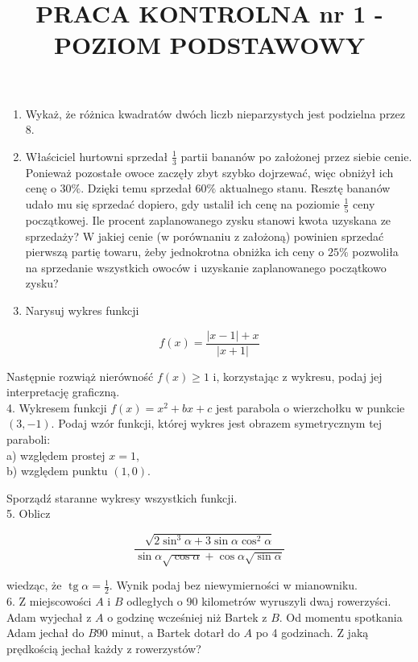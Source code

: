 \documentclass[10pt]{article}
\title{PRACA KONTROLNA nr 1 - POZIOM PODSTAWOWY }
\author{}
\date{}
\begin{document}
\maketitle
\begin{enumerate}
  \item Wykaż, że różnica kwadratów dwóch liczb nieparzystych jest podzielna przez 8.
  \item Właściciel hurtowni sprzedał $\frac{1}{3}$ partii bananów po założonej przez siebie cenie. Ponieważ pozostałe owoce zaczęły zbyt szybko dojrzewać, więc obniżył ich cenę o $30 \%$. Dzięki temu sprzedał $60 \%$ aktualnego stanu. Resztę bananów udało mu się sprzedać dopiero, gdy ustalił ich cenę na poziomie $\frac{1}{5}$ ceny początkowej. Ile procent zaplanowanego zysku stanowi kwota uzyskana ze sprzedaży? W jakiej cenie (w porównaniu z założoną) powinien sprzedać pierwszą partię towaru, żeby jednokrotna obniżka ich ceny o $25 \%$ pozwoliła na sprzedanie wszystkich owoców i uzyskanie zaplanowanego początkowo zysku?
  \item Narysuj wykres funkcji
\end{enumerate}

$$
f(x)=\frac{|x-1|+x}{|x+1|}
$$

Następnie rozwiąż nierówność $f(x) \geqslant 1$ i, korzystając z wykresu, podaj jej interpretację graficzną.\\
4. Wykresem funkcji $f(x)=x^{2}+b x+c$ jest parabola o wierzchołku w punkcie $(3,-1)$. Podaj wzór funkcji, której wykres jest obrazem symetrycznym tej paraboli:\\
a) względem prostej $x=1$,\\
b) względem punktu $(1,0)$.

Sporządź staranne wykresy wszystkich funkcji.\\
5. Oblicz

$$
\frac{\sqrt{2 \sin ^{3} \alpha+3 \sin \alpha \cos ^{2} \alpha}}{\sin \alpha \sqrt{\cos \alpha}+\cos \alpha \sqrt{\sin \alpha}}
$$

wiedząc, że $\operatorname{tg} \alpha=\frac{1}{2}$. Wynik podaj bez niewymierności w mianowniku.\\
6. Z miejscowości $A$ i $B$ odległych o 90 kilometrów wyruszyli dwaj rowerzyści. Adam wyjechał z $A$ o godzinę wcześniej niż Bartek z $B$. Od momentu spotkania Adam jechał do $B 90$ minut, a Bartek dotarł do $A$ po 4 godzinach. Z jaką prędkością jechał każdy z rowerzystów?
\end{document}
